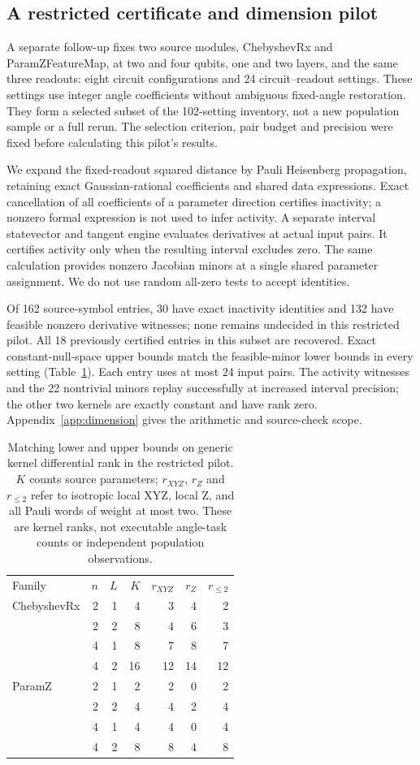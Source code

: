 \subsection{A restricted certificate and dimension pilot}
\label{sec:dimensionpilot}
A separate follow-up fixes two source modules, ChebyshevRx and
ParamZFeatureMap, at two and four qubits, one and two layers, and the
same three readouts: eight circuit configurations and 24 circuit--readout
settings. These settings use integer angle coefficients without
ambiguous fixed-angle restoration. They form a selected subset of the
102-setting inventory, not a new population sample or a full rerun.
The selection criterion, pair budget and precision were fixed before
calculating this pilot's results.

We expand the fixed-readout squared distance by Pauli Heisenberg
propagation, retaining exact Gaussian-rational coefficients and shared
data expressions. Exact cancellation of all coefficients of a parameter
direction certifies inactivity; a nonzero formal expression is not used
to infer activity. A separate interval statevector and tangent engine
evaluates derivatives at actual input pairs. It certifies activity only
when the resulting interval excludes zero. The same calculation provides
nonzero Jacobian minors at a single shared parameter assignment. We do
not use random all-zero tests to accept identities.

Of 162 source-symbol entries, 30 have exact inactivity identities and
132 have feasible nonzero derivative witnesses; none remains undecided
in this restricted pilot. All 18 previously certified entries in this
subset are recovered. Exact constant-null-space upper bounds match
the feasible-minor lower bounds in every setting
(Table~\ref{tab:dimension}). Each entry uses at most 24 input pairs.
The activity witnesses and the 22 nontrivial minors replay successfully
at increased interval precision; the other two kernels are exactly
constant and have rank zero. Appendix~\ref{app:dimension} gives the
arithmetic and source-check scope.

\begin{table}[t]
\caption{Matching lower and upper bounds on generic kernel differential
rank in the restricted pilot. $K$ counts source parameters; $r_{XYZ}$,
$r_Z$ and $r_{\le2}$ refer to isotropic local XYZ, local Z, and all Pauli
words of weight at most two. These are kernel ranks, not executable
angle-task counts or independent population observations.}
\label{tab:dimension}
\begin{tabular}{lrrrrrr}
\toprule
Family & $n$ & $L$ & $K$ & $r_{XYZ}$ & $r_Z$ & $r_{\le2}$\\
ChebyshevRx &2&1&4&3&4&2\\
 &2&2&8&4&6&3\\
 &4&1&8&7&8&7\\
 &4&2&16&12&14&12\\
ParamZ &2&1&2&2&0&2\\
 &2&2&4&4&2&4\\
 &4&1&4&4&0&4\\
 &4&2&8&8&4&8\\
\bottomrule
\end{tabular}
\end{table}

